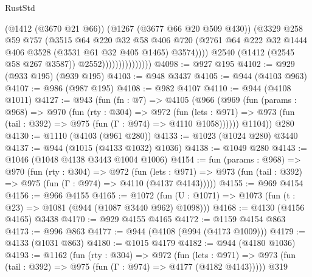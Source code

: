 \begin{lexlean}{RustStd}
\begin{coremodule}
{\begin{coremodule}
{{{{{{{{{{                                    (@1412 (@3670 @21 @66))
                                    (@1267 (@3677 @66 @20 @509 @430))
                                    (@3329
                                      @258
                                      @59
                                      @757
                                      (@3515
                                        @64
                                        @220
                                        @32
                                        @58
                                        @406
                                        @720
                                        (@2761
                                          @64
                                          @222
                                          @32
                                          @1444
                                          @406
                                          @3528
                                          (@3531 @61 @32 @405 @1465)
                                          @3574))))
                                  @2540
                                  (@1412 (@2545 @58 @267 @3587))
                                  @2552)))))))))))))))
@4098 := @927 @195
@4102 := @929 (@933 @195) (@939 @195)
@4103 := @948 @3437
@4105 := @944 (@4103 @963)
@4107 := @986 (@987 @195)
@4108 := @982 @4107
@4110 := @944 (@4108 @1011)
@4127 := @943
    (fun (fn : @7) =>
    @4105
      (@966
        (@969
          (fun (params : @968) =>
          @970
            (fun (rty : @304) =>
            @972
              (fun (lets : @971) =>
              @973 (fun (tail : @392) => @975 (fun (Γ : @974) => @4110 @1058))))))
        @1104))
    @280
@4130 := @1110 (@4103 (@961 @280))
@4133 := @1023 (@1024 @280) @3440
@4137 := @944 (@1015 (@4133 @1032) @1036)
@4138 := @1049 @280
@4143 := @1046 (@1048 @4138 @3443 @1004 @1006)
@4154 := fun (params : @968) =>
  @970
    (fun (rty : @304) =>
    @972
      (fun (lets : @971) =>
      @973 (fun (tail : @392) => @975 (fun (Γ : @974) => @4110 (@4137 @4143)))))
@4155 := @969 @4154
@4156 := @966 @4155
@4165 := @1072 (fun (U : @1071) => @1073 (fun (t : @23) => @1081 (@944 (@1087 @3440 @962) @1098)))
@4168 := @4130 (@4156 @4165) @3438
@4170 := @929 @4155 @4165
@4172 := @1159 @4154 @863
@4173 := @996 @863
@4177 := @944 (@4108 (@994 (@4173 @1009)))
@4179 := @4133 (@1031 @863)
@4180 := @1015 @4179
@4182 := @944 (@4180 @1036)
@4193 := @1162
    (fun (rty : @304) =>
    @972
      (fun (lets : @971) =>
      @973 (fun (tail : @392) => @975 (fun (Γ : @974) => @4177 (@4182 @4143)))))
    @319
}}}}}}}}}}
\end{coremodule}}
\end{coremodule}
\end{lexlean}
